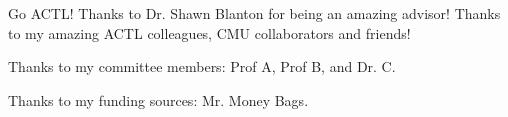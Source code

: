 \begin{thesisacknowledgments}
  Go ACTL! Thanks to Dr. Shawn Blanton for being an amazing advisor! Thanks to my amazing ACTL colleagues, CMU collaborators and friends!

  Thanks to my committee members: Prof A, Prof B, and Dr. C.

  Thanks to my funding sources: Mr. Money Bags.
\end{thesisacknowledgments}
